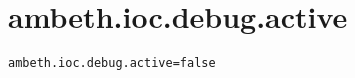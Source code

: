 \section{ambeth.ioc.debug.active}
\label{configuration:AmbethIocDebugActive}
\AvailableInJavaAndCsharp{\TODO}
\begin{lstlisting}[style=Props,caption={Usage example for \textit{ambeth.ioc.debug.active}}]
ambeth.ioc.debug.active=false
\end{lstlisting}